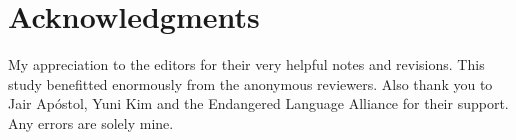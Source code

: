\documentclass[output=paper]{langscibook}
\begin{document}
\section*{Acknowledgments} 

My appreciation to the editors for their very helpful notes and revisions. This study benefitted enormously from the anonymous reviewers. Also thank you to Jair Apóstol, Yuni Kim and the Endangered Language Alliance for their support. Any errors are solely mine.

\sloppy\printbibliography[heading=subbibliography,notkeyword=this]
\end{document}
